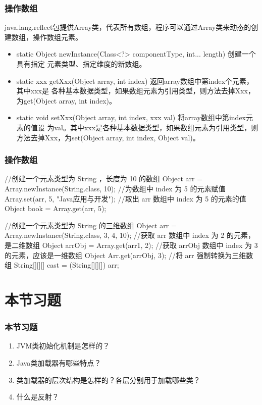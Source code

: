 \begin{frame}[fragile] %
\frametitle{操作数组}

java.lang.reflect包提供Array类，代表所有数组，程序可以通过Array类来动态的创建数组，操作数组元素。

\begin{itemize}
\item static Object newInstance(Class<?> componentType, int... length) 创建一个具有指定
  元素类型、指定维度的新数组。
\item static xxx getXxx(Object array, int index) 返回array数组中第index个元素，其中xxx是
  各种基本数据类型，如果数组元素为引用类型，则方法去掉Xxx，为get(Object array, int
  index)。
\item static void setXxx(Object array, int index, xxx val) 将array数组中第index元素的值设
  为val。其中xxx是各种基本数据类型，如果数组元素为引用类型，则方法去掉Xxx，为set(Object
  array, int index, Object val)。
\end{itemize}
\end{frame}

\begin{frame}[fragile] %
\frametitle{操作数组}
\begin{javaCode}
//创建一个元素类型为 String ，长度为 10 的数组
Object arr = Array.newInstance(String.class, 10);
//为数组中 index 为 5 的元素赋值
Array.set(arr, 5, "Java应用与开发");
//取出 arr 数组中 index 为 5 的元素的值
Object book = Array.get(arr, 5);

//创建一个元素类型为 String 的三维数组
Object arr = Array.newInstance(String.class, 3, 4, 10);
//获取 arr 数组中 index 为 2 的元素，是二维数组
Object arrObj = Array.get(arr1, 2);
//获取 arrObj 数组中 index 为 3 的元素，应该是一维数组
Object Arr.get(arrObj, 3);
//将 arr 强制转换为三维数组
String[][][] cast = (String[][][]) arr;
\end{javaCode}
\end{frame}


\section{本节习题}

\begin{frame}
  \frametitle{本节习题}

  
  \begin{enumerate}
  \item JVM类初始化机制是怎样的？
  \item Java类加载器有哪些特点？
  \item 类加载器的层次结构是怎样的？各层分别用于加载哪些类？
  \item 什么是反射？
  \end{enumerate}
\end{frame}
  

